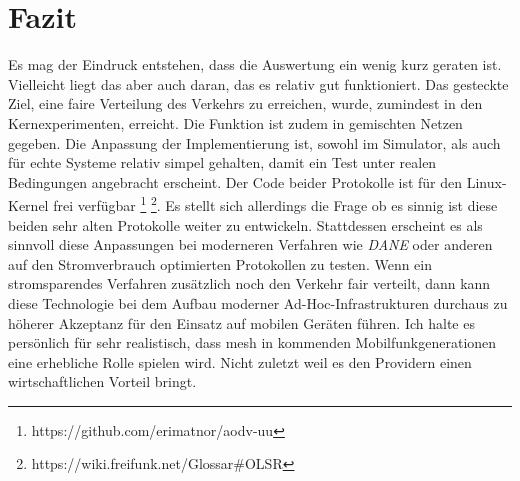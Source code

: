 
\chapter{Fazit}
\label{chapter:fazit}

Es mag der Eindruck entstehen, dass die Auswertung ein wenig kurz geraten ist. Vielleicht liegt das aber auch daran, das es relativ gut funktioniert. Das gesteckte Ziel, eine faire Verteilung des Verkehrs zu erreichen, wurde, zumindest in den Kernexperimenten, erreicht. Die Funktion ist zudem in gemischten Netzen gegeben. Die Anpassung der Implementierung ist, sowohl im Simulator, als auch für echte Systeme relativ simpel gehalten, damit ein Test unter realen Bedingungen angebracht erscheint. Der Code beider Protokolle ist für den Linux-Kernel frei verfügbar \footnote{https://github.com/erimatnor/aodv-uu} \footnote{https://wiki.freifunk.net/Glossar\#OLSR}. Es stellt sich allerdings die Frage ob es sinnig ist diese beiden sehr alten Protokolle weiter zu entwickeln. Stattdessen erscheint es als sinnvoll diese Anpassungen bei moderneren Verfahren wie \textit{DANE} oder anderen auf den Stromverbrauch optimierten Protokollen zu testen. Wenn ein stromsparendes Verfahren zusätzlich noch den Verkehr fair verteilt, dann kann diese Technologie bei dem Aufbau moderner Ad-Hoc-Infrastrukturen durchaus zu höherer Akzeptanz für den Einsatz auf mobilen Geräten führen. Ich halte es persönlich für sehr realistisch, dass \gls{mesh} in kommenden Mobilfunkgenerationen eine erhebliche Rolle spielen wird. Nicht zuletzt weil es den Providern einen wirtschaftlichen Vorteil bringt. \newline